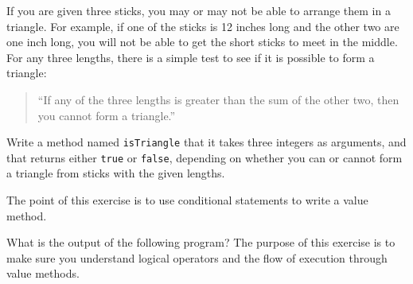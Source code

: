 \documentclass[12pt]{book}
\begin{document}
\begin{exercise}
If you are given three sticks, you may or may not be able to arrange them in a triangle.
For example, if one of the sticks is 12 inches long and the other two are one inch long, you will not be able to get the short sticks to meet in the middle.
For any three lengths, there is a simple test to see if it is possible to form a triangle:

\begin{quotation}
``If any of the three lengths is greater than the sum of the other two, then you cannot form a triangle.''
\end{quotation}

Write a method named {\tt isTriangle} that it takes three integers as arguments, and that returns either {\tt true} or {\tt false}, depending on whether you can or cannot form a triangle from sticks with the given lengths.

The point of this exercise is to use conditional statements to write a value method.
\end{exercise}

\begin{exercise}
What is the output of the following program?
The purpose of this exercise is to make sure you understand logical operators and the flow of execution through value methods.

\end{exercise}
\end{document}

